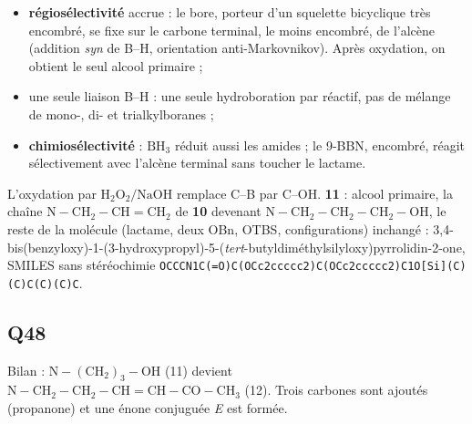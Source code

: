 \documentclass[11pt,a4paper]{article}
\providecommand{\tightlist}{\setlength{\itemsep}{0pt}\setlength{\parskip}{0pt}}
\begin{document}
\begin{itemize}
\tightlist
\item
  \textbf{régiosélectivité} accrue : le bore, porteur d'un squelette bicyclique très encombré, se fixe sur le carbone terminal, le moins encombré, de l'alcène (addition \emph{syn} de B--H, orientation anti-Markovnikov). Après oxydation, on obtient le seul alcool primaire ;
\item
  une seule liaison B--H : une seule hydroboration par réactif, pas de mélange de mono-, di- et trialkylboranes ;
\item
  \textbf{chimiosélectivité} : \(\mathrm{BH_3}\) réduit aussi les amides ; le 9-BBN, encombré, réagit sélectivement avec l'alcène terminal sans toucher le lactame.
\end{itemize}

L'oxydation par \(\mathrm{H_2O_2}/\mathrm{NaOH}\) remplace C--B par C--OH. \textbf{11} : alcool primaire, la chaîne \(\mathrm{N{-}CH_2{-}CH{=}CH_2}\) de \textbf{10} devenant \(\mathrm{N{-}CH_2{-}CH_2{-}CH_2{-}OH}\), le reste de la molécule (lactame, deux OBn, OTBS, configurations) inchangé : 3,4-\allowbreak{}bis(benzyloxy)-\allowbreak{}1-\allowbreak{}(3-\allowbreak{}hydroxypropyl)-\allowbreak{}5-\allowbreak{}(\emph{tert}-\allowbreak{}butyldiméthylsilyloxy)pyrrolidin-\allowbreak{}2-\allowbreak{}one, SMILES sans stéréochimie \texttt{OCCCN1C(\allowbreak{}=\allowbreak{}O)\allowbreak{}C(\allowbreak{}OCc2ccccc2)\allowbreak{}C(\allowbreak{}OCc2ccccc2)\allowbreak{}C1O{[}Si{]}\allowbreak{}(\allowbreak{}C)\allowbreak{}(\allowbreak{}C)\allowbreak{}C(\allowbreak{}C)\allowbreak{}(\allowbreak{}C)\allowbreak{}C}.

\hypertarget{q48}{%
\subsection{Q48}\label{q48}}

Bilan : \(\mathrm{N{-}(CH_2)_3{-}OH}\) (11) devient \(\mathrm{N{-}CH_2{-}CH_2{-}CH{=}CH{-}CO{-}CH_3}\) (12). Trois carbones sont ajoutés (propanone) et une énone conjuguée \emph{E} est formée.
\end{document}
